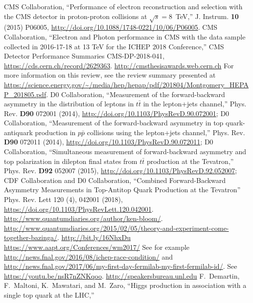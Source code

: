 \begin{thebibliography}{99}
%
CMS Collaboration, ``Performance of electron reconstruction and selection with the CMS detector in proton-proton collisions at $\sqrt{s}=$8~TeV,'' J. Instrum. {\bf 10} (2015) P06005, \url{http://doi.org/10.1088/1748-0221/10/06/P06005}.
%
    CMS Collaboration, ``Electron and Photon performance in CMS with the data sample collected in 2016-17-18 at 13 TeV for the ICHEP 2018 Conference,''
    CMS Detector Performance Summaries CMS-DP-2018-041, \url{https://cds.cern.ch/record/2629363}.
%
 \url{http://cmsthesisawards.web.cern.ch}
%
 For more information on this review, see the review summary presented at \url{https://science.energy.gov/~/media/hep/hepap/pdf/201804/Montgomery_HEPAP_201805.pdf}.
%
D0 Collaboration, ``Measurement of the forward-backward asymmetry in the distribution of leptons in $t\bar{t}$ in the lepton+jets channel,'' Phys. Rev. {\bf D90} 072001 (2014), \url{http://doi.org/10.1103/PhysRevD.90.072001};
D0 Collaboration, ``Measurement of the forward-backward asymmetry in top quark-antiquark production in $p\bar{p}$ collisions using the lepton+jets channel,'' Phys. Rev. {\bf D90} 072011 (2014), \url{http://doi.org/10.1103/PhysRevD.90.072011};
D0 Collaboration, ``Simultaneous measurement of forward-backward asymmetry and top polarization in dilepton final states from $t\bar{t}$ production at the Tevatron,'' Phys. Rev. {\bf D92} 052007 (2015), \url{http://doi.org/10.1103/PhysRevD.92.052007};
CDF Collaboration and D0 Collaboration, ``Combined Forward-Backward Asymmetry Measurements in Top-Antitop Quark Production at the Tevatron'' Phys. Rev. Lett 120 (4), 042001 (2018), \url{https://doi.org/10.1103/PhysRevLett.120.042001}.
%
%
 \url{http://www.quantumdiaries.org/author/ken-bloom/}.
%
 \url{http://www.quantumdiaries.org/2015/02/05/theory-and-experiment-come-together-bazinga/}.
%
 \url{http://bit.ly/16NhxDu}
%
 \url{https://www.aapt.org/Conferences/wm2017/}
%
 See for example \url{http://news.fnal.gov/2016/08/ichep-race-condition/} and \url{http://news.fnal.gov/2017/06/my-first-day-fermilab-my-first-fermilab-id/}.
%
 See \url{https://youtu.be/nsR7nZNKqoo}.
%
 \url{http://speakersbureau.unl.edu}
%
 F.~Demartin, F.~Maltoni, K.~Mawatari, and M.~Zaro,
  ``Higgs production in association with a single top quark at the LHC,''

\end{thebibliography}
